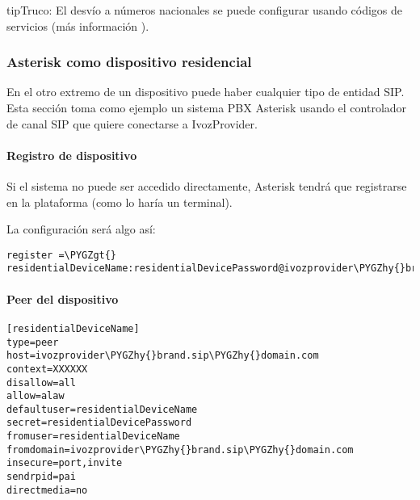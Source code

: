 \documentclass[letterpaper,10pt,spanish]{sphinxmanual}
\def\PYGZgt{\char`\>}
\def\PYGZhy{\char`\-}
\begin{document}
\begin{notice}{tip}{Truco:}
El desvío a números nacionales se puede configurar usando códigos de servicios (más información {\hyperref[administration_portal/brand/settings/generic_services:call\string-forward\string-services]{}}).
\end{notice}


\subsubsection{Asterisk como dispositivo residencial}
\label{administration_portal/client/residential/residential_devices:asterisk-as-a-residential-device}
En el otro extremo de un dispositivo puede haber cualquier tipo de entidad SIP. Esta sección toma como ejemplo un sistema PBX Asterisk usando el controlador de canal SIP que quiere conectarse a IvozProvider.


\paragraph{Registro de dispositivo}
\label{administration_portal/client/residential/residential_devices:device-register}
Si el sistema no puede ser accedido directamente, Asterisk tendrá que registrarse en la plataforma (como lo haría un terminal).

La configuración será algo así:

\begin{Verbatim}[commandchars=\\\{\}]
register =\PYGZgt{} residentialDeviceName:residentialDevicePassword@ivozprovider\PYGZhy{}brand.sip\PYGZhy{}domain.com
\end{Verbatim}


\paragraph{Peer del dispositivo}
\label{administration_portal/client/residential/residential_devices:device-peer}
\begin{Verbatim}[commandchars=\\\{\}]
[residentialDeviceName]
type=peer
host=ivozprovider\PYGZhy{}brand.sip\PYGZhy{}domain.com
context=XXXXXX
disallow=all
allow=alaw
defaultuser=residentialDeviceName
secret=residentialDevicePassword
fromuser=residentialDeviceName
fromdomain=ivozprovider\PYGZhy{}brand.sip\PYGZhy{}domain.com
insecure=port,invite
sendrpid=pai
directmedia=no
\end{Verbatim}
\end{document}
